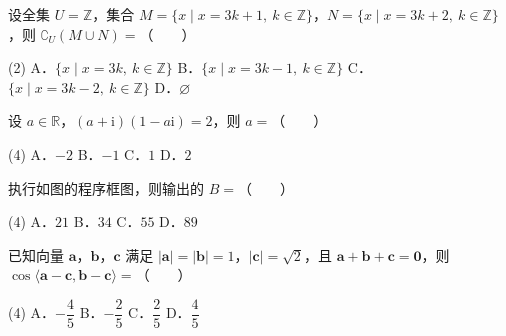 

\par\medskip


\begin{question}
设全集 $U=\mathbb Z$，集合 $M=\{x\mid x=3k+1,\ k\in\mathbb Z\}$，$N=\{x\mid x=3k+2,\ k\in\mathbb Z\}$，则 $\complement_U(M\cup N)=$\mbox{（　　）}

\begin{gkopts}(2)
\task A．$\{x\mid x=3k,\ k\in\mathbb Z\}$
\task B．$\{x\mid x=3k-1,\ k\in\mathbb Z\}$
\task C．$\{x\mid x=3k-2,\ k\in\mathbb Z\}$
\task D．$\varnothing$
\end{gkopts}

\end{question}
\begin{question}
设 $a\in\mathbb R$，$(a+\mathrm i)(1-a\mathrm i)=2$，则 $a=$\mbox{（　　）}

\begin{gkopts}(4)
\task A．$-2$
\task B．$-1$
\task C．$1$
\task D．$2$
\end{gkopts}

\Needspace{0.4\textheight}
\end{question}
\begin{question}
执行如图的程序框图，则输出的 $B=$\mbox{（　　）}
\nopagebreak[4]
\begin{center}\end{center}
\nopagebreak[4]
\begin{gkopts}(4)
\task A．$21$
\task B．$34$
\task C．$55$
\task D．$89$
\end{gkopts}

\end{question}
\begin{question}
已知向量 $\boldsymbol a$，$\boldsymbol b$，$\boldsymbol c$ 满足 $|\boldsymbol a|=|\boldsymbol b|=1$，$|\boldsymbol c|=\sqrt2$，且 $\boldsymbol a+\boldsymbol b+\boldsymbol c=\boldsymbol0$，则 $\cos\langle\boldsymbol a-\boldsymbol c,\boldsymbol b-\boldsymbol c\rangle=$\mbox{（　　）}

\begin{gkopts}(4)
\task A．$-\dfrac45$
\task B．$-\dfrac25$
\task C．$\dfrac25$
\task D．$\dfrac45$
\end{gkopts}

\end{question}
